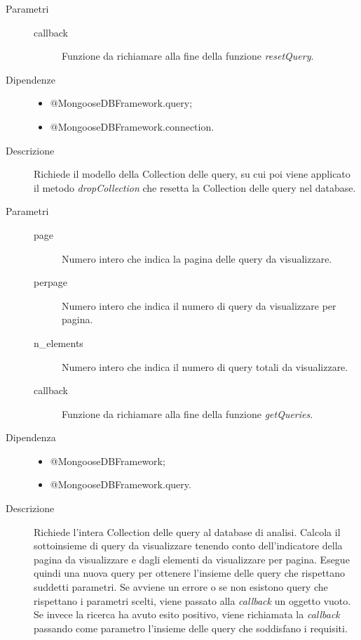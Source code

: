 \begin{description}
\begin{mldescription}
    \begin{description}
	 \item[Parametri]
	  \begin{description}
	   \item[callback]
	   Funzione da richiamare alla fine della funzione \textit{resetQuery}.
	  \end{description}
	 \item[Dipendenze]
	  \begin{itemize}
	   \item @MongooseDBFramework.query;
	   \item @MongooseDBFramework.connection.
	  \end{itemize}
	 \item[Descrizione]
	 Richiede il modello della Collection delle query, su cui poi viene applicato il metodo \textit{dropCollection} che resetta la Collection delle query nel database.
	\end{description}	    
    
    \begin{description}
	 \item[Parametri]
	  \begin{description}
	   \item[page]
	   Numero intero che indica la pagina delle query da visualizzare.
	   \item[perpage]
	   Numero intero che indica il numero di query da visualizzare per pagina.
	   \item[n\_elements]
	   Numero intero che indica il numero di query totali da visualizzare.
	   \item[callback]
	   Funzione da richiamare alla fine della funzione \textit{getQueries}.
	  \end{description}
	 \item[Dipendenza]
	  \begin{itemize}
	   \item @MongooseDBFramework;	   
	   \item @MongooseDBFramework.query.
	  \end{itemize}
	 \item[Descrizione]
	 Richiede l'intera Collection delle query al database di analisi. Calcola il sottoinsieme di query da visualizzare tenendo conto dell'indicatore della pagina da visualizzare e dagli elementi da visualizzare per pagina. Esegue quindi una nuova query per ottenere l'insieme delle query che rispettano suddetti parametri. Se avviene un errore o se non esistono query che rispettano i parametri scelti, viene passato alla \textit{callback} un oggetto vuoto. Se invece la ricerca ha avuto esito positivo, viene richiamata la \textit{callback} passando come parametro l'insieme delle query che soddisfano i requisiti. 
	\end{description}	    
    

\end{mldescription}
\end{description}
